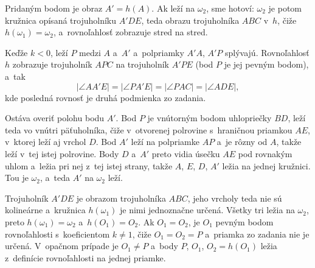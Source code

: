 {    Pridaným bodom je obraz $A' = h(A)$. Ak leží na $\omega_2$, sme hotoví: $\omega_2$ je potom kružnica opísaná trojuholníku $A'DE$, teda obrazu trojuholníka $ABC$ v~$h$, čiže $h(\omega_1) = \omega_2$, a~rovnoľahlosť zobrazuje stred na stred.

    Keďže $k < 0$, leží $P$ medzi $A$ a~$A'$ a~polpriamky $A'A$, $A'P$ splývajú. Rovnoľahlosť $h$ zobrazuje trojuholník $APC$ na trojuholník $A'PE$ (bod $P$ je jej pevným bodom), a~tak
    $$
    |\angle AA'E| = |\angle PA'E| = |\angle PAC| = |\angle ADE|,
    $$
    kde posledná rovnosť je druhá podmienka zo zadania.

    Ostáva overiť polohu bodu $A'$. Bod $P$ je vnútorným bodom uhlopriečky $BD$, leží teda vo vnútri päťuholníka, čiže v~otvorenej polrovine s~hraničnou priamkou $AE$, v~ktorej leží aj vrchol $D$. Bod $A'$ leží na polpriamke $AP$ a~je rôzny od $A$, takže leží v~tej istej polrovine. Body $D$ a~$A'$ preto vidia úsečku $AE$ pod rovnakým uhlom a~ležia pri nej z~tej istej strany, takže $A$, $E$, $D$, $A'$ ležia na jednej kružnici. Tou je $\omega_2$, a~teda $A'$ na $\omega_2$ leží.

    Trojuholník $A'DE$ je obrazom trojuholníka $ABC$, jeho vrcholy teda nie sú kolineárne a~kružnica $h(\omega_1)$ je nimi jednoznačne určená. Všetky tri ležia na $\omega_2$, preto $h(\omega_1) = \omega_2$ a~$h(O_1) = O_2$. Ak $O_1 = O_2$, je $O_1$ pevným bodom rovnoľahlosti s~koeficientom $k \neq 1$, čiže $O_1 = O_2 = P$ a~priamka zo zadania nie je určená. V~opačnom prípade je $O_1 \neq P$ a~body $P$, $O_1$, $O_2 = h(O_1)$ ležia z~definície rovnoľahlosti na jednej priamke.
}

